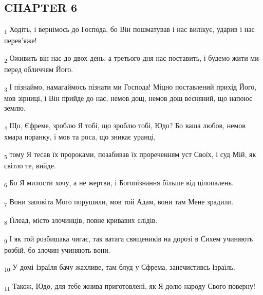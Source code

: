 \subsection{CHAPTER 6}
\begin{tcolorbox}
\textsubscript{1} Ходіть, і вернімось до Господа, бо Він пошматував і нас вилікує, ударив і нас перев'яже!
\end{tcolorbox}
\begin{tcolorbox}
\textsubscript{2} Оживить він нас до двох день, а третього дня нас поставить, і будемо жити ми перед обличчям Його.
\end{tcolorbox}
\begin{tcolorbox}
\textsubscript{3} І пізнаймо, намагаймось пізнати ми Господа! Міцно поставлений прихід Його, мов зірниці, і Він прийде до нас, немов дощ, немов дощ весняний, що напоює землю.
\end{tcolorbox}
\begin{tcolorbox}
\textsubscript{4} Що, Єфреме, зроблю Я тобі, що зроблю тобі, Юдо? Бо ваша любов, немов хмара поранку, і мов та роса, що зникає уранці,
\end{tcolorbox}
\begin{tcolorbox}
\textsubscript{5} тому Я тесав їх пророками, позабивав їх прореченням уст Своїх, і суд Мій, як світло те, вийде.
\end{tcolorbox}
\begin{tcolorbox}
\textsubscript{6} Бо Я милости хочу, а не жертви, і Богопізнання більше від цілопалень.
\end{tcolorbox}
\begin{tcolorbox}
\textsubscript{7} Вони заповіта Мого порушили, мов той Адам, вони там Мене зрадили.
\end{tcolorbox}
\begin{tcolorbox}
\textsubscript{8} Ґілеад, місто злочинців, повне кривавих слідів.
\end{tcolorbox}
\begin{tcolorbox}
\textsubscript{9} І як той розбишака чигає, так ватага священиків на дорозі в Сихем учиняють розбій, бо злочин учиняють вони.
\end{tcolorbox}
\begin{tcolorbox}
\textsubscript{10} У домі Ізраїля бачу жахливе, там блуд у Єфрема, занечистивсь Ізраїль.
\end{tcolorbox}
\begin{tcolorbox}
\textsubscript{11} Також, Юдо, для тебе жнива приготовлені, як Я долю народу Свого поверну!
\end{tcolorbox}
